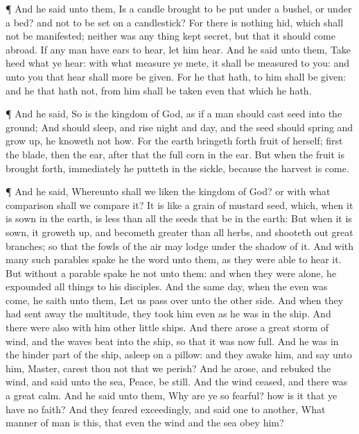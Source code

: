  ¶ And he said unto them, Is a candle brought to be put
under a bushel, or under a bed? and not to be set on a candlestick?
 For there is nothing hid, which shall not be manifested;
neither was any thing kept secret, but that it should come abroad.
 If any man have ears to hear, let him hear. 
And he said unto them, Take heed what ye hear: with what measure ye
mete, it shall be measured to you: and unto you that hear shall more be
given.  For he that hath, to him shall be given: and he
that hath not, from him shall be taken even that which he hath.

 ¶ And he said, So is the kingdom of God, as if a man
should cast seed into the ground;  And should sleep, and
rise night and day, and the seed should spring and grow up, he knoweth
not how.  For the earth bringeth forth fruit of herself;
first the blade, then the ear, after that the full corn in the ear.
 But when the fruit is brought forth, immediately he
putteth in the sickle, because the harvest is come.

 ¶ And he said, Whereunto shall we liken the kingdom of
God? or with what comparison shall we compare it?  It is
like a grain of mustard seed, which, when it is sown in the earth, is
less than all the seeds that be in the earth:  But when it
is sown, it groweth up, and becometh greater than all herbs, and
shooteth out great branches; so that the fowls of the air may lodge
under the shadow of it.  And with many such parables spake
he the word unto them, as they were able to hear it.  But
without a parable spake he not unto them: and when they were alone, he
expounded all things to his disciples.  And the same day,
when the even was come, he saith unto them, Let us pass over unto the
other side.  And when they had sent away the multitude,
they took him even as he was in the ship. And there were also with him
other little ships.  And there arose a great storm of wind,
and the waves beat into the ship, so that it was now full. 
And he was in the hinder part of the ship, asleep on a pillow: and they
awake him, and say unto him, Master, carest thou not that we perish?
 And he arose, and rebuked the wind, and said unto the sea,
Peace, be still. And the wind ceased, and there was a great calm.
 And he said unto them, Why are ye so fearful? how is it
that ye have no faith?  And they feared exceedingly, and
said one to another, What manner of man is this, that even the wind and
the sea obey him?

